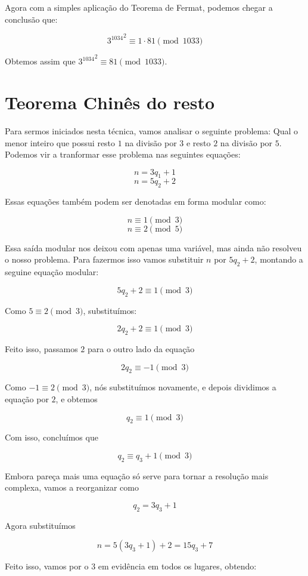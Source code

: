 Agora com a simples aplica\c{c}\~ao do Teorema de Fermat, podemos chegar a conclus\~ao que: 

$${3^{1034}}^2 \equiv 1 \cdot 81 \pmod{1033}$$

Obtemos assim que ${3^{1034}}^{2} \equiv 81 \pmod{1033}$.

\section{Teorema Chin\^es do resto}

Para sermos iniciados nesta t\'ecnica, vamos analisar o seguinte problema: Qual o menor inteiro que possui resto $1$ na divis\~ao por $3$ e resto $2$ na divis\~ao por $5$. Podemos vir a tranformar esse problema nas seguintes equa\c{c}\~oes:

$$n = 3q_1 + 1$$ $$n = 5q_2 + 2$$

Essas equa\c{c}\~oes tamb\'em podem ser denotadas em forma modular como:

$$n \equiv 1\pmod{3}$$ $$n \equiv 2 \pmod{5}$$

Essa sa\'ida modular nos deixou com apenas uma vari\'avel, mas ainda n\~ao resolveu o nosso problema. Para fazermos isso vamos substituir $n$ por $5q_2 + 2$, montando a seguine equa\c{c}\~ao modular:

$$5q_2 + 2 \equiv 1 \pmod{3}$$

Como $5 \equiv 2\pmod{3}$, substitu\'imos:

$$ 2q_2 + 2 \equiv 1 \pmod{3}$$

Feito isso, passamos $2$ para o outro lado da equa\c{c}\~ao

$$ 2q_2  \equiv -1 \pmod{3}$$

Como $-1 \equiv 2 \pmod{3}$, n\'os substitu\'imos novamente, e depois dividimos a equa\c{c}\~ao por $2$, e obtemos

$$ q_2  \equiv 1 \pmod{3}$$

Com isso, conclu\'imos que

$$ q_2  \equiv q_3 + 1 \pmod{3}$$

Embora pare\c{c}a mais uma equa\c{c}\~ao s\'o serve para tornar a resolu\c{c}\~ao mais complexa, vamos a reorganizar como

$$ q_2 = 3q_3 + 1 $$

Agora substitu\'imos

$$n = 5(3q_3 + 1) + 2 = 15q_3 +7$$

Feito isso, vamos por o $3$ em evid\^encia em todos os lugares, obtendo:

